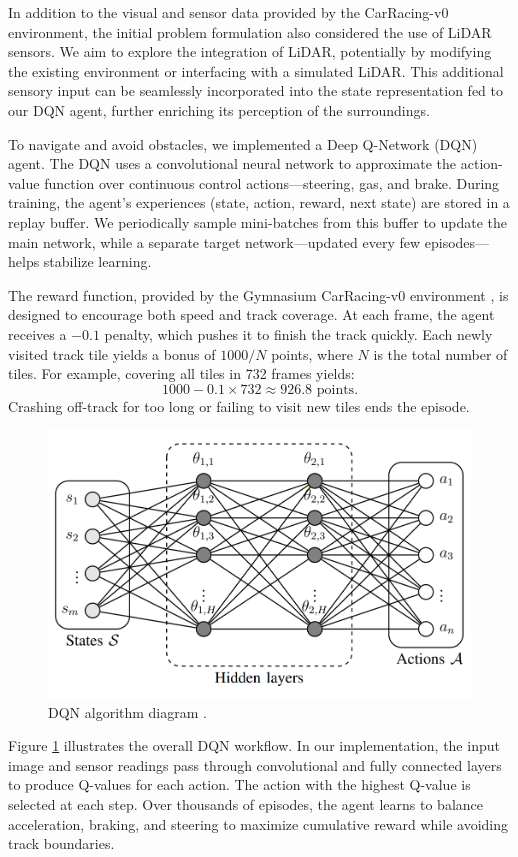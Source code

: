 In addition to the visual and sensor data provided by the CarRacing-v0 environment, the initial problem formulation also considered the use of LiDAR sensors. We aim to explore the integration of LiDAR, potentially by modifying the existing environment or interfacing with a simulated LiDAR. This additional sensory input can be seamlessly incorporated into the state representation fed to our DQN agent, further enriching its perception of the surroundings.

To navigate and avoid obstacles, we implemented a Deep Q-Network (DQN) agent. The DQN uses a convolutional neural network to approximate the action-value function over continuous control actions—steering, gas, and brake. During training, the agent’s experiences (state, action, reward, next state) are stored in a replay buffer. We periodically sample mini-batches from this buffer to update the main network, while a separate target network—updated every few episodes—helps stabilize learning.

The reward function, provided by the Gymnasium CarRacing-v0 environment  \cite{gymnasium2023}, is designed to encourage both speed and track coverage. At each frame, the agent receives a \(-0.1\) penalty, which pushes it to finish the track quickly. Each newly visited track tile yields a bonus of \(1000/N\) points, where \(N\) is the total number of tiles. For example, covering all tiles in 732 frames yields:
\[
    1000 - 0.1 \times 732 \approx 926.8 \text{ points}.
\]
Crashing off-track for too long or failing to visit new tiles ends the episode.

\begin{figure}[h]
    \centering
    \includegraphics[width=0.8\linewidth]{images/DQNmodel.png}
    \caption{DQN algorithm diagram \cite{DQNimage}.}
    \label{fig:dqn_diagram}
\end{figure}

Figure \ref{fig:dqn_diagram} illustrates the overall DQN workflow. In our implementation, the input image and sensor readings pass through convolutional and fully connected layers to produce Q-values for each action. The action with the highest Q-value is selected at each step. Over thousands of episodes, the agent learns to balance acceleration, braking, and steering to maximize cumulative reward while avoiding track boundaries.

